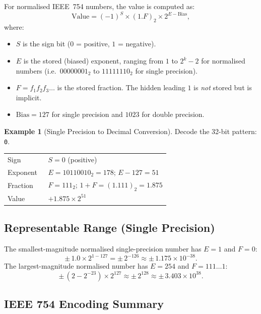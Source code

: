 \documentclass[11pt, a4paper, notitlepage]{report}
\theoremstyle{definition}
\theoremstyle{remark}
\theoremstyle{definition}
\newtheorem{example}[theorem]{Example}
\begin{document}
For normalised IEEE~754 numbers, the value is computed as:
\begin{equation}
  \label{eq:ieee754}
  \text{Value} = (-1)^S \times (1.F)_2 \times 2^{E - \mathrm{Bias}},
\end{equation}
where:
\begin{itemize}
  \item $S$ is the sign bit ($0$ = positive, $1$ = negative).
  \item $E$ is the stored (biased) exponent, ranging from $1$ to $2^k - 2$ for normalised numbers (i.e.\ $00000001_2$ to $11111110_2$ for single precision).
  \item $F = f_1 f_2 f_3 \ldots$ is the stored fraction. The hidden leading $1$ is \emph{not} stored but is implicit.
  \item $\mathrm{Bias} = 127$ for single precision and $1023$ for double precision.
\end{itemize}

\begin{example}[Single Precision to Decimal Conversion]
  \label{ex:ieee754-decode}
  Decode the 32-bit pattern: \texttt{0}.

  \medskip
  \begin{tabular}{@{}lp{0.75\linewidth}@{}}
    \toprule
    Sign & $S = 0$ (positive) \\
    Exponent & $E = 10110010_2 = 178$; $E - 127 = 51$ \\
    Fraction & $F = 111_2$; $1{+}F = (1.111)_2 = 1.875$ \\
    \midrule
    Value & $+1.875 \times 2^{51}$ \\
    \bottomrule
  \end{tabular}
\end{example}

\subsection{Representable Range (Single Precision)}
\label{sec:ieee754-range}

The smallest-magnitude normalised single-precision number has $E = 1$ and $F = 0$:
\[
  \pm\, 1.0 \times 2^{1 - 127} = \pm\, 2^{-126} \approx \pm\, 1.175 \times 10^{-38}.
\]
The largest-magnitude normalised number has $E = 254$ and $F = 111\ldots1$:
\[
  \pm\,(2 - 2^{-23}) \times 2^{127} \approx \pm\, 2^{128} \approx \pm\, 3.403 \times 10^{38}.
\]

\subsection{IEEE 754 Encoding Summary}
\label{sec:ieee754-encoding}
\end{document}
